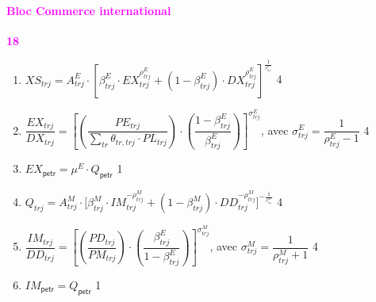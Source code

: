 \documentclass[11pt,a4paper]{article}
\newcommand{\trj}{\mathit{trj}}
\newcommand{\DD}{\mathit{DD}}
\newcommand{\DX}{\mathit{DX}}
\newcommand{\EX}{\mathit{EX}}
\newcommand{\IM}{\mathit{IM}}
\newcommand{\PE}{\mathit{PE}}
\newcommand{\PD}{\mathit{PD}}
\newcommand{\PL}{\mathit{PL}}
\newcommand{\PM}{\mathit{PM}}
\newcommand{\petr}{\mathsf{petr}}
\newcommand{\tr}{\mathit{tr}}
\newcommand{\XS}{\mathit{XS}}
\newcommand{\redparagraph}[1]{\paragraph*{\large\textcolor{Fuchsia}{#1}}}
\begin{document}
	
	\redparagraph{Bloc Commerce international}\hfill \textcolor{Fuchsia}{\textbf{18}}
	\begin{enumerate}[itemsep=2pt,label=\textbf{eq\arabic*}.,resume,  ref=\textbf{eq\arabic*}]
		
		\item $\XS_{\trj} = A_{\trj}^E \cdot \left[\beta_{\trj}^E\cdot\EX_{\trj}^{\rho_{\trj}^E} + \left(1 - \beta_{\trj}^E\right)\cdot \DX_{\trj}^{\rho_{\trj}^E}\right]^{\frac{1}{^{\rho_{\trj}^E}}}$ \hfill 4
		
		\item  $\dfrac{\EX_{\trj}}{\DX_{\trj}} = \left[\left(\dfrac{\PE_{\trj}}{\displaystyle\sum_{\tr}\theta_{\tr,\trj}\cdot\PL_{\trj}}\right)\cdot\left(\dfrac{1-\beta_{\trj}^E}{\beta_{\trj}^E}\right)\right]^{\sigma_{\trj}^E}$, avec $\sigma^E_{\trj} = \dfrac{1}{\rho_{\trj}^E-1}$  \label{it:EX} \hfill 4
		
		\item $\EX_{\petr} = \mu^{E}_{}\cdot Q_{\petr}$ \label{it:EXpetr}\hfill 1
		
		\item $Q_{\trj} = A_{\trj}^M \cdot \bigg[\beta_{\trj}^M\cdot\IM_{\trj}^{-\rho_{\trj}^M} + \left(1 - \beta_{\trj}^M\right)\cdot\DD_{\trj}^{-\rho_{\trj}^M}\bigg]^{-\frac{1}{^{\rho_{\trj}^M}}}$ \label{it:Q} \hfill 4 
		
		
		
		\item  $\dfrac{\IM_{\trj}}{\DD_{\trj}} = \left[\left(\dfrac{\PD_{\trj}}{\PM_{\trj}}\right)\cdot\left(\dfrac{\beta_{\trj}^E}{1-\beta_{\trj}^E}\right)\right]^{\sigma_{\trj}^M}$, avec $\sigma^M_{\trj} = \dfrac{1}{\rho_{\trj}^M+1}$ \label{it:IM}  \hfill 4
		
		\item $\IM_{\petr} = Q_{\petr}$ \hfill 1
		
		
	\end{enumerate}
	
\end{document}
